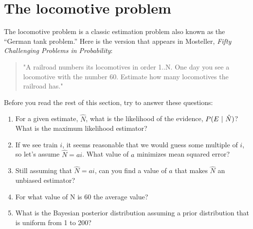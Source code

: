 \documentclass[12pt]{book}
\begin{document}
\section{The locomotive problem}


The locomotive problem is a classic estimation problem also
known as the ``German tank problem.''  Here is the version
that appears in Mosteller, {\it Fifty Challenging Problems in
  Probability}:

\begin{quote}
"A railroad numbers its locomotives in order 1..N.  One day you see a
locomotive with the number 60.  Estimate how many locomotives the
railroad has."
\end{quote}

Before you read the rest of this section, try to answer these
questions:

\newcommand{\nhat}{\hat{N}}

\begin{enumerate}

\item For a given estimate, $\nhat$, what is the likelihood of the
  evidence, $P(E \given \nhat)$?  What is the maximum likelihood estimator?


\item If we see train $i$, it seems reasonable that we would guess
  some multiple of $i$, so let's assume $\nhat = a i$.  What value of
  $a$ minimizes mean squared error?


\item Still assuming that $\nhat = a i$, can you find a value of $a$
  that makes $\nhat$ an unbiased estimator?


\item For what value of N is 60 the average value?

\item What is the Bayesian posterior distribution assuming a prior
distribution that is uniform from 1 to 200?


\end{enumerate}
\end{document}

